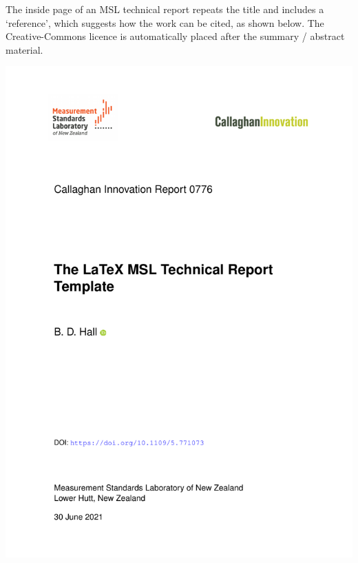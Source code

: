 {\newpage
The inside page of an MSL technical report repeats the title and includes a `reference', which suggests how the work can be cited, as shown below. The Creative-Commons licence is automatically placed after the summary / abstract material. 

\begin{center}
\includegraphics[scale=.5,page=2]{pictures/Report}
\end{center}

}

